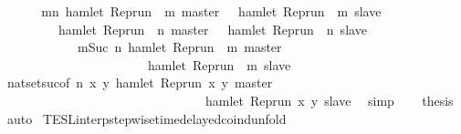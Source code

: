 \begin{isabellebody}
\ {\isacharminus}\isanewline
\ \ \isamarkupfalse%
\ {\isacartoucheopen}{\isacharbraceleft}{\isasymrho}{\isachardot}\ {\isasymforall}m{\isasymge}n{\isachardot}\ hamlet\ {\isacharparenleft}{\isacharparenleft}Rep{\isacharunderscore}run\ {\isasymrho}{\isacharparenright}\ m\ master{\isacharparenright}\ {\isasymlongrightarrow}\ {\isasymnot}\ hamlet\ {\isacharparenleft}{\isacharparenleft}Rep{\isacharunderscore}run\ {\isasymrho}{\isacharparenright}\ m\ slave{\isacharparenright}{\isacharbraceright}\isanewline
\ \ \ \ \ \ \ {\isacharequal}\ {\isacharbraceleft}{\isasymrho}{\isachardot}\ hamlet\ {\isacharparenleft}{\isacharparenleft}Rep{\isacharunderscore}run\ {\isasymrho}{\isacharparenright}\ n\ master{\isacharparenright}\ {\isasymlongrightarrow}\ {\isasymnot}\ hamlet\ {\isacharparenleft}{\isacharparenleft}Rep{\isacharunderscore}run\ {\isasymrho}{\isacharparenright}\ n\ slave{\isacharparenright}{\isacharbraceright}\isanewline
\ \ \ \ \ \ \ \ \ \ {\isasyminter}\ {\isacharbraceleft}{\isasymrho}{\isachardot}\ {\isasymforall}m{\isasymge}Suc\ n{\isachardot}\ hamlet\ {\isacharparenleft}{\isacharparenleft}Rep{\isacharunderscore}run\ {\isasymrho}{\isacharparenright}\ m\ master{\isacharparenright}\isanewline
\ \ \ \ \ \ \ \ \ \ \ \ \ \ \ \ \ \ \ \ \ {\isasymlongrightarrow}\ {\isasymnot}\ hamlet\ {\isacharparenleft}{\isacharparenleft}Rep{\isacharunderscore}run\ {\isasymrho}{\isacharparenright}\ m\ slave{\isacharparenright}{\isacharbraceright}{\isacartoucheclose}\isanewline
\ \ \ \ \isamarkupfalse%
\ nat{\isacharunderscore}set{\isacharunderscore}suc{\isacharbrackleft}of\ {\isacartoucheopen}n{\isacartoucheclose}\ {\isacartoucheopen}{\isasymlambda}x\ y{\isachardot}\ hamlet\ {\isacharparenleft}{\isacharparenleft}Rep{\isacharunderscore}run\ x{\isacharparenright}\ y\ master{\isacharparenright}\isanewline
\ \ \ \ \ \ \ \ \ \ \ \ \ \ \ \ \ \ \ \ \ \ \ \ \ \ \ \ \ \ \ {\isasymlongrightarrow}\ {\isasymnot}hamlet\ {\isacharparenleft}{\isacharparenleft}Rep{\isacharunderscore}run\ x{\isacharparenright}\ y\ slave{\isacharparenright}{\isacartoucheclose}{\isacharbrackright}\ \isamarkupfalse%
\ simp\isanewline
\ \ \isamarkupfalse%
\ {\isacharquery}thesis\ \isamarkupfalse%
\ auto\isanewline
{}\isamarkupfalse%
%
\endisatagproof
{\isafoldproof}%
%
\isadelimproof
\isanewline
%
\endisadelimproof
\isanewline
{}\isamarkupfalse%
\ TESL{\isacharunderscore}interp{\isacharunderscore}stepwise{\isacharunderscore}timedelayed{\isacharunderscore}coind{\isacharunderscore}unfold{\isacharcolon}\isanewline

\end{isabellebody}
